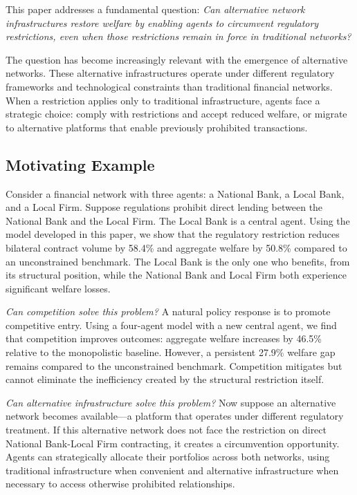 \documentclass[12pt]{article}
\begin{document}
This paper addresses a fundamental question: \textit{Can alternative network infrastructures restore welfare by enabling agents to circumvent regulatory restrictions, even when those restrictions remain in force in traditional networks?}

The question has become increasingly relevant with the emergence of alternative networks. These alternative infrastructures operate under different regulatory frameworks and technological constraints than traditional financial networks. When a restriction applies only to traditional infrastructure, agents face a strategic choice: comply with restrictions and accept reduced welfare, or migrate to alternative platforms that enable previously prohibited transactions.

\subsection{Motivating Example}


Consider a financial network with three agents: a National Bank, a Local Bank, and a Local Firm. Suppose regulations prohibit direct lending between the National Bank and the Local Firm. The Local Bank is a central agent. Using the model developed in this paper, we show that the regulatory restriction reduces bilateral contract volume by 58.4\% and aggregate welfare by 50.8\% compared to an unconstrained benchmark. The Local Bank is the only one who benefits, from its structural position, while the National Bank and Local Firm both experience significant welfare losses.

\textit{Can competition solve this problem?} A natural policy response is to promote competitive entry. Using a four-agent model with a new central agent, we find that competition improves outcomes: aggregate welfare increases by 46.5\% relative to the monopolistic baseline. However, a persistent 27.9\% welfare gap remains compared to the unconstrained benchmark. Competition mitigates but cannot eliminate the inefficiency created by the structural restriction itself.

\textit{Can alternative infrastructure solve this problem?} Now suppose an alternative network becomes available---a platform that operates under different regulatory treatment. If this alternative network does not face the restriction on direct National Bank-Local Firm contracting, it creates a circumvention opportunity. Agents can strategically allocate their portfolios across both networks, using traditional infrastructure when convenient and alternative infrastructure when necessary to access otherwise prohibited relationships.
\end{document}
